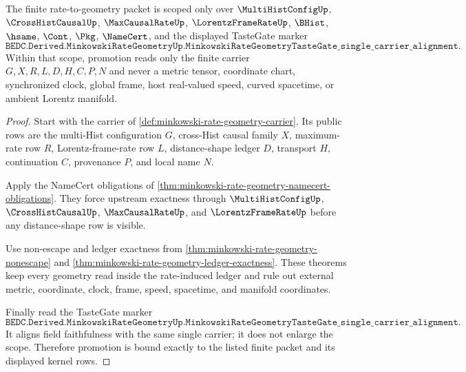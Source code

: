 \begin{theorem}
\label{thm:minkowski-rate-geometry-scope-binding}
The finite rate-to-geometry packet is scoped only over $\MultiHistConfigUp$, $\CrossHistCausalUp$, $\MaxCausalRateUp$, $\LorentzFrameRateUp$, $\BHist$, $\hsame$, $\Cont$, $\Pkg$, $\NameCert$, and the displayed TasteGate marker
$$
\texttt{BEDC.Derived.MinkowskiRateGeometryUp.MinkowskiRateGeometryTasteGate\_single\_carrier\_alignment}.
$$
Within that scope, promotion reads only the finite carrier $G,X,R,L,D,H,C,P,N$ and never a metric tensor, coordinate chart, synchronized clock, global frame, host real-valued speed, curved spacetime, or ambient Lorentz manifold.
\end{theorem}
\begin{proof}
Start with the carrier of \autoref{def:minkowski-rate-geometry-carrier}. Its public rows are the multi-Hist configuration $G$, cross-Hist causal family $X$, maximum-rate row $R$, Lorentz-frame-rate row $L$, distance-shape ledger $D$, transport $H$, continuation $C$, provenance $P$, and local name $N$.

Apply the NameCert obligations of \autoref{thm:minkowski-rate-geometry-namecert-obligations}. They force upstream exactness through $\MultiHistConfigUp$, $\CrossHistCausalUp$, $\MaxCausalRateUp$, and $\LorentzFrameRateUp$ before any distance-shape row is visible.

Use non-escape and ledger exactness from \autoref{thm:minkowski-rate-geometry-nonescape} and \autoref{thm:minkowski-rate-geometry-ledger-exactness}. These theorems keep every geometry read inside the rate-induced ledger and rule out external metric, coordinate, clock, frame, speed, spacetime, and manifold coordinates.

Finally read the TasteGate marker
$$
\texttt{BEDC.Derived.MinkowskiRateGeometryUp.MinkowskiRateGeometryTasteGate\_single\_carrier\_alignment}.
$$
It aligns field faithfulness with the same single carrier; it does not enlarge the scope. Therefore promotion is bound exactly to the listed finite packet and its displayed kernel rows.
\end{proof}

